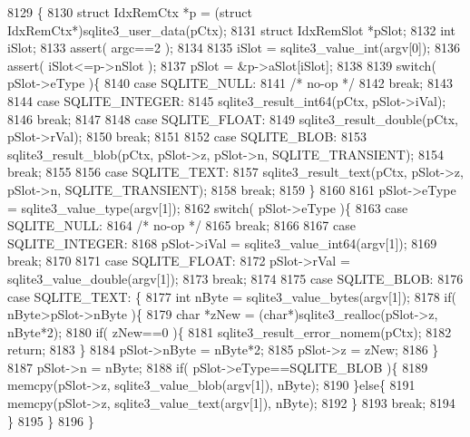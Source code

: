 \begin{DoxyCode}
8129  \{
8130   \textcolor{keyword}{struct }IdxRemCtx *p = (\textcolor{keyword}{struct }IdxRemCtx*)sqlite3_user_data(pCtx);
8131   \textcolor{keyword}{struct }IdxRemSlot *pSlot;
8132   \textcolor{keywordtype}{int} iSlot;
8133   assert( argc==2 );
8134 
8135   iSlot = sqlite3_value_int(argv[0]);
8136   assert( iSlot<=p->nSlot );
8137   pSlot = &p->aSlot[iSlot];
8138 
8139   \textcolor{keywordflow}{switch}( pSlot->eType )\{
8140     \textcolor{keywordflow}{case} SQLITE_NULL:
8141       \textcolor{comment}{/* no-op */}
8142       \textcolor{keywordflow}{break};
8143 
8144     \textcolor{keywordflow}{case} SQLITE_INTEGER:
8145       sqlite3_result_int64(pCtx, pSlot->iVal);
8146       \textcolor{keywordflow}{break};
8147 
8148     \textcolor{keywordflow}{case} SQLITE_FLOAT:
8149       sqlite3_result_double(pCtx, pSlot->rVal);
8150       \textcolor{keywordflow}{break};
8151 
8152     \textcolor{keywordflow}{case} SQLITE_BLOB:
8153       sqlite3_result_blob(pCtx, pSlot->z, pSlot->n, SQLITE_TRANSIENT);
8154       \textcolor{keywordflow}{break};
8155 
8156     \textcolor{keywordflow}{case} SQLITE_TEXT:
8157       sqlite3_result_text(pCtx, pSlot->z, pSlot->n, SQLITE_TRANSIENT);
8158       \textcolor{keywordflow}{break};
8159   \}
8160 
8161   pSlot->eType = sqlite3_value_type(argv[1]);
8162   \textcolor{keywordflow}{switch}( pSlot->eType )\{
8163     \textcolor{keywordflow}{case} SQLITE_NULL:
8164       \textcolor{comment}{/* no-op */}
8165       \textcolor{keywordflow}{break};
8166 
8167     \textcolor{keywordflow}{case} SQLITE_INTEGER:
8168       pSlot->iVal = sqlite3_value_int64(argv[1]);
8169       \textcolor{keywordflow}{break};
8170 
8171     \textcolor{keywordflow}{case} SQLITE_FLOAT:
8172       pSlot->rVal = sqlite3_value_double(argv[1]);
8173       \textcolor{keywordflow}{break};
8174 
8175     \textcolor{keywordflow}{case} SQLITE_BLOB:
8176     \textcolor{keywordflow}{case} SQLITE_TEXT: \{
8177       \textcolor{keywordtype}{int} nByte = sqlite3_value_bytes(argv[1]);
8178       \textcolor{keywordflow}{if}( nByte>pSlot->nByte )\{
8179         \textcolor{keywordtype}{char} *zNew = (\textcolor{keywordtype}{char}*)sqlite3_realloc(pSlot->z, nByte*2);
8180         \textcolor{keywordflow}{if}( zNew==0 )\{
8181           sqlite3_result_error_nomem(pCtx);
8182           \textcolor{keywordflow}{return};
8183         \}
8184         pSlot->nByte = nByte*2;
8185         pSlot->z = zNew;
8186       \}
8187       pSlot->n = nByte;
8188       \textcolor{keywordflow}{if}( pSlot->eType==SQLITE_BLOB )\{
8189         memcpy(pSlot->z, sqlite3_value_blob(argv[1]), nByte);
8190       \}\textcolor{keywordflow}{else}\{
8191         memcpy(pSlot->z, sqlite3_value_text(argv[1]), nByte);
8192       \}
8193       \textcolor{keywordflow}{break};
8194     \}
8195   \}
8196 \}
\end{DoxyCode}
\mbox{\label{shell_8c_a95c2ea48965a3475f0ad8d981fcdd0ff}} 
